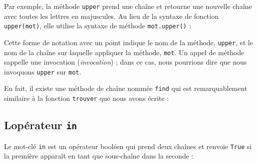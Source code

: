 Par exemple, la méthode \texttt{upper} prend une chaîne et retourne une
nouvelle chaîne avec toutes les lettres en majuscules. Au lieu de la
syntaxe de fonction \texttt{upper(mot)}, elle utilise la syntaxe de
méthode \texttt{mot.upper()} :

\begin{Shaded}
\begin{Highlighting}[]
\OperatorTok{\textgreater{}\textgreater{}\textgreater{}}\OperatorTok{=} 
\OperatorTok{\textgreater{}\textgreater{}\textgreater{}}\OperatorTok{=}
\OperatorTok{\textgreater{}\textgreater{}\textgreater{}}
\end{Highlighting}
\end{Shaded}

Cette forme de notation avec un point indique le nom de la méthode,
\texttt{upper}, et le nom de la chaîne sur laquelle appliquer la
méthode, \texttt{mot}. Un appel de méthode s\textquotesingle appelle une
invocation (\emph{invocation}) ; dans ce cas, nous pourrions dire que
nous invoquons \texttt{upper} sur \texttt{mot}.

En fait, il existe une méthode de chaîne nommée \texttt{find} qui est
remarquablement similaire à la fonction \texttt{trouver} que nous avons
écrite :

\begin{Shaded}
\begin{Highlighting}[]
\OperatorTok{\textgreater{}\textgreater{}\textgreater{}}\OperatorTok{=} 
\OperatorTok{\textgreater{}\textgreater{}\textgreater{}}\OperatorTok{=}\NormalTok{)}
\OperatorTok{\textgreater{}\textgreater{}\textgreater{}}
\end{Highlighting}
\end{Shaded}

\hypertarget{lopuxe9rateur-in}{%
\subsection{\texorpdfstring{L\textquotesingle opérateur
\texttt{in}}{L\textquotesingle opérateur in}}\label{lopuxe9rateur-in}}

Le mot-clé \texttt{in} est un opérateur booléen qui prend deux chaînes
et renvoie \texttt{True} si la première apparaît en tant que sous-chaîne
dans la seconde :

